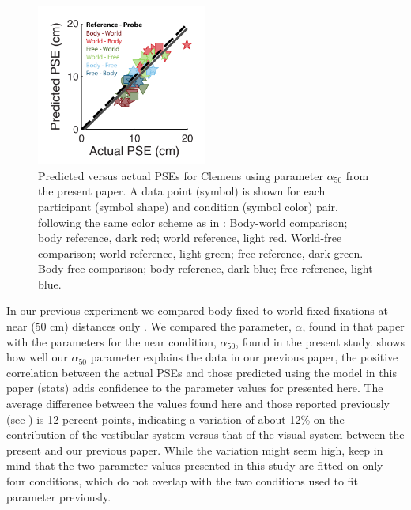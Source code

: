 \begin{figure}
    \includegraphics[width=0.5\textwidth]{src/paper4/p4_figure6.pdf}

    \caption{Predicted versus actual PSEs for Clemens \protect\citeyear{clemens2015a} using parameter $\alpha_{50}$ from the present paper. A data point (symbol) is shown for each participant (symbol shape) and condition (symbol color) pair, following the same color scheme as in \protect{}: Body-world comparison; body reference, dark red; world reference, light red. World-free comparison; world reference, light green; free reference, dark green. Body-free comparison; body reference, dark blue; free reference, light blue.}
    \label{p4:fig6}
\end{figure}

In our previous experiment we compared body-fixed to world-fixed fixations at near (50 \si{\centi\metre}) distances only \cite{clemens2015a}. We compared the parameter, $\alpha$, found in that paper with the parameters for the near condition, $\alpha_{50}$, found in the present study.  shows how well our $\alpha_{50}$ parameter explains the data in our previous paper, the positive correlation between the actual PSEs and those predicted using the model in this paper (stats) adds confidence to the parameter values for  presented here. The average difference between the values found here and those reported previously (see ) is 12  percent-points, indicating a variation of about 12\% on the contribution of the vestibular system versus that of the visual system between the present and our previous paper. While the variation might seem high, keep in mind that the two parameter values presented in this study are fitted on only four conditions, which do not overlap with the two conditions used to fit  parameter  previously.


